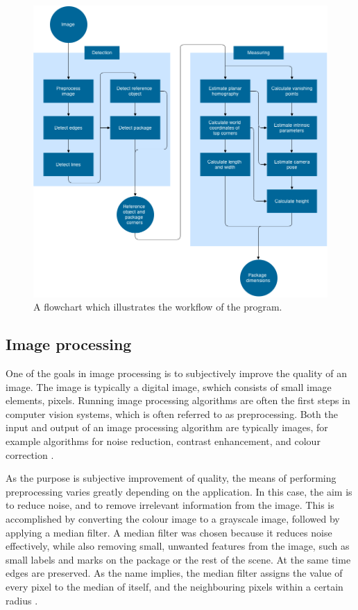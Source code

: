 \begin{figure}
\begin{center}
\includegraphics[width=1.0\textwidth]{figures/flowchart.png}
\end{center}
\caption{A flowchart which illustrates the workflow of the program.}
\label{fig:flowchart}
\end{figure}

\subsection{Image processing}
One of the goals in image processing is to subjectively improve the quality of an image. 
The image is typically a digital image, swhich consists of small image elements, pixels.
Running image processing algorithms are often the first steps in computer vision systems, which is often referred to as preprocessing.
Both the input and output of an image processing algorithm are typically images, for example algorithms for noise reduction, contrast enhancement, and colour correction \cite[p. 1-2]{gonzalez-woods}. 

As the purpose is subjective improvement of quality, the means of performing preprocessing varies greatly depending on the application.
In this case, the aim is to reduce noise, and to remove irrelevant information from the image.
This is accomplished by converting the colour image to a grayscale image, followed by applying a median filter. 
A median filter was chosen because it reduces noise effectively, while also removing small, unwanted features from the image, such as small labels and marks on the package or the rest of the scene.
At the same time edges are preserved.
As the name implies, the median filter assigns the value of every pixel to the median of itself, and the neighbouring pixels within a certain radius \cite{huang1979fast}.

